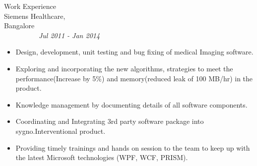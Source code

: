 \begin{category}{Work Experience}
\\
Siemens Healthcare, Bangalore~~~~~~~~~~~~~~~~~~~~~~~~~~~~~~~~~~~~~~~~~~~~~~~~~~~~~~~~~~~~~~~~~~~~~~~~~\textit{Jul 2011 - Jan 2014}
\begin{itemize}
    \item {Design, development, unit testing and bug fixing of medical Imaging software.}
    \item {Exploring and incorporating the new algorithms, strategies to meet the performance(Increase by 5\%) and memory(reduced leak of 100 MB/hr) in the product.}
    \item {Knowledge management by documenting details of all software components.}
    \item {Coordinating and Integrating 3rd party software package into sygno.Interventional product.}
    \item {Providing timely trainings and hands on session to the team to keep up with the latest Microsoft technologies (WPF, WCF, PRISM).}\\
\end{itemize}

\end{category}
